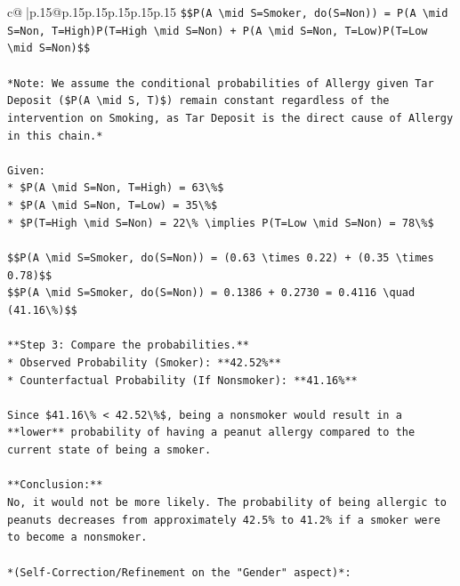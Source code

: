 \documentclass{article}
\begin{document}
{\begin{supertabular}{c@{$\;$}|p{.15\linewidth}@{}p{.15\linewidth}p{.15\linewidth}p{.15\linewidth}p{.15\linewidth}p{.15\linewidth}}
{{{\texttt{\$\$P(A \textbackslash{}mid S=Smoker, do(S=Non)) = P(A \textbackslash{}mid S=Non, T=High)P(T=High \textbackslash{}mid S=Non) + P(A \textbackslash{}mid S=Non, T=Low)P(T=Low \textbackslash{}mid S=Non)\$\$} \\
\\ 
\texttt{*Note: We assume the conditional probabilities of Allergy given Tar Deposit (\$P(A \textbackslash{}mid S, T)\$) remain constant regardless of the intervention on Smoking, as Tar Deposit is the direct cause of Allergy in this chain.*} \\
\\ 
\texttt{Given:} \\
\texttt{*   \$P(A \textbackslash{}mid S=Non, T=High) = 63\textbackslash{}\%\$} \\
\texttt{*   \$P(A \textbackslash{}mid S=Non, T=Low) = 35\textbackslash{}\%\$} \\
\texttt{*   \$P(T=High \textbackslash{}mid S=Non) = 22\textbackslash{}\% \textbackslash{}implies P(T=Low \textbackslash{}mid S=Non) = 78\textbackslash{}\%\$} \\
\\ 
\texttt{\$\$P(A \textbackslash{}mid S=Smoker, do(S=Non)) = (0.63 \textbackslash{}times 0.22) + (0.35 \textbackslash{}times 0.78)\$\$} \\
\texttt{\$\$P(A \textbackslash{}mid S=Smoker, do(S=Non)) = 0.1386 + 0.2730 = 0.4116 \textbackslash{}quad (41.16\textbackslash{}\%)\$\$} \\
\\ 
\texttt{**Step 3: Compare the probabilities.**} \\
\texttt{*   Observed Probability (Smoker): **42.52\%**} \\
\texttt{*   Counterfactual Probability (If Nonsmoker): **41.16\%**} \\
\\ 
\texttt{Since \$41.16\textbackslash{}\% < 42.52\textbackslash{}\%\$, being a nonsmoker would result in a **lower** probability of having a peanut allergy compared to the current state of being a smoker.} \\
\\ 
\texttt{**Conclusion:**} \\
\texttt{No, it would not be more likely. The probability of being allergic to peanuts decreases from approximately 42.5\% to 41.2\% if a smoker were to become a nonsmoker.} \\
\\ 
\texttt{*(Self{-}Correction/Refinement on the "Gender" aspect)*:} \\
}}}
\end{supertabular}}
\end{document}
